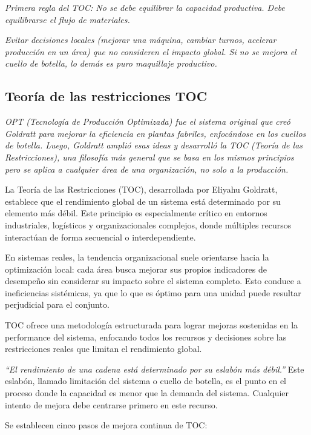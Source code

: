 \documentclass[a4paper,oneside,11pt]{article}
\begin{document}
\textit{Primera regla del TOC: No se debe equilibrar la capacidad productiva. Debe equilibrarse el flujo de materiales.}

\textit{Evitar decisiones locales (mejorar una máquina, cambiar turnos, acelerar producción en un área) que no consideren el impacto global. Si no se mejora el cuello de botella, lo demás es puro maquillaje productivo.}

\subsection{Teoría de las restricciones TOC}

\textit{OPT (Tecnología de Producción Optimizada) fue el sistema original que creó Goldratt para mejorar la eficiencia en plantas fabriles, enfocándose en los cuellos de botella.
Luego, Goldratt amplió esas ideas y desarrolló la TOC (Teoría de las Restricciones), una filosofía más general que se basa en los mismos principios pero se aplica a cualquier área de una organización, no solo a la producción.}


La Teoría de las Restricciones (TOC), desarrollada por Eliyahu Goldratt, establece que el rendimiento global de un sistema está determinado por su elemento más débil. Este principio es especialmente crítico en entornos industriales, logísticos y organizacionales complejos, donde múltiples recursos interactúan de forma secuencial o interdependiente.

En sistemas reales, la tendencia organizacional suele orientarse hacia la optimización local: cada área busca mejorar sus propios indicadores de desempeño sin considerar su impacto sobre el sistema completo. Esto conduce a ineficiencias sistémicas, ya que lo que es óptimo para una unidad puede resultar perjudicial para el conjunto.

TOC ofrece una metodología estructurada para lograr mejoras sostenidas en la performance del sistema, enfocando todos los recursos y decisiones sobre las restricciones reales que limitan el rendimiento global.

\textit{“El rendimiento de una cadena está determinado por su eslabón más débil.”}
Este eslabón, llamado limitación del sistema o cuello de botella, es el punto en el proceso donde la capacidad es menor que la demanda del sistema. Cualquier intento de mejora debe centrarse primero en este recurso.

Se establecen cinco pasos de mejora continua de TOC:
\end{document}
